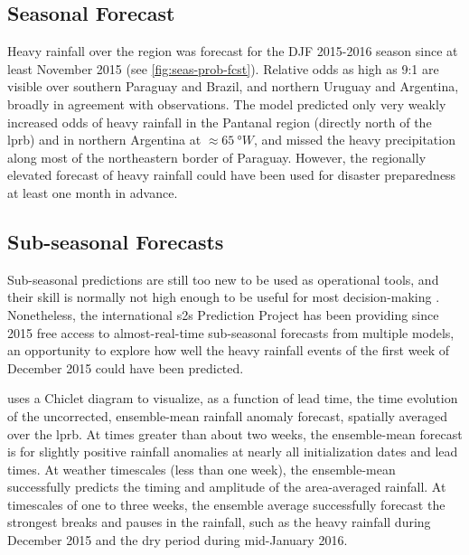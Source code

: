 \documentclass{ametsoc}
\begin{document}
\subsection{Seasonal Forecast}

Heavy rainfall over the region was forecast for the DJF 2015-2016 season since at least November 2015 (see \cref{fig:seas-prob-fcst}).
Relative odds as high as 9:1 are visible over southern Paraguay and Brazil, and northern Uruguay and Argentina, broadly in agreement with observations.
The model predicted only very weakly increased odds of heavy rainfall in the Pantanal region (directly north of the \gls{lprb}) and in northern Argentina at $\approx \SI{65}{\degree W}$, and missed the heavy precipitation along most of the northeastern border of Paraguay.
However, the regionally elevated forecast of heavy rainfall could have been used for disaster preparedness at least one month in advance.

\subsection{Sub-seasonal Forecasts}

Sub-seasonal predictions are still too new to be used as operational tools, and their skill is normally not high enough to be useful for most decision-making \citep{Vigaud2017}.
Nonetheless, the international \gls{s2s} Prediction Project \citep{Vitart2016} has been providing since 2015 free access to almost-real-time sub-seasonal forecasts from multiple models, an opportunity to explore how well the heavy rainfall events of the first week of December 2015 could have been predicted.

 uses a Chiclet diagram \citep{Carbin2016} to visualize, as a function of lead time, the time evolution of the uncorrected, ensemble-mean rainfall anomaly forecast, spatially averaged over the \gls{lprb}.
At times greater than about two weeks, the ensemble-mean forecast is for slightly positive rainfall anomalies at nearly all initialization dates and lead times.
At weather timescales (less than one week), the ensemble-mean successfully predicts the timing and amplitude of the area-averaged rainfall.
At timescales of one to three weeks, the ensemble average successfully forecast the strongest breaks and pauses in the rainfall, such as the heavy rainfall during December 2015 and the dry period during mid-January 2016.
\end{document}
